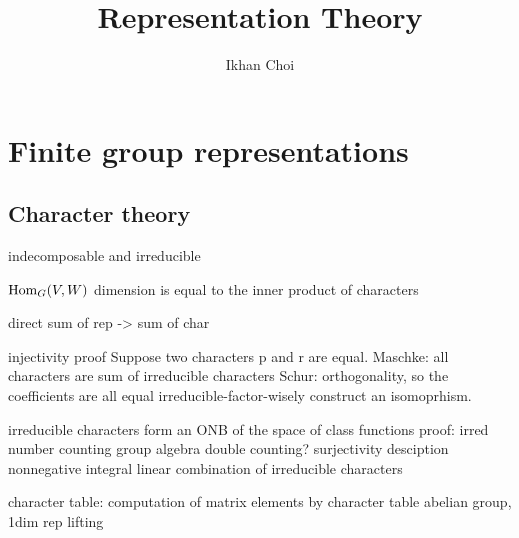\documentclass{../note}
\begin{document}
\title{Representation Theory}
\author{Ikhan Choi}
\maketitle
\tableofcontents

\part{Finite group representations}
\chapter{Character theory}

\begin{prb}
\end{prb}

\begin{prb}
\end{prb}

\begin{prb}
indecomposable and irreducible
\end{prb}

\begin{prb}
\end{prb}






\begin{prb}
$\operatorname{Hom}_G(V,W)$
dimension is equal to the inner product of characters
\end{prb}



direct sum of rep -> sum of char

injectivity proof
	Suppose two characters p and r are equal.
	Maschke: all characters are sum of irreducible characters
	Schur: orthogonality, so the coefficients are all equal
	irreducible-factor-wisely construct an isomoprhism.

irreducible characters form an ONB of the space of class functions
	proof: irred number counting
	group algebra double counting?
surjectivity desciption
	nonnegative integral linear combination of irreducible characters

character table: %
computation of matrix elements by character table
abelian group, 1dim rep lifting
\end{document}
